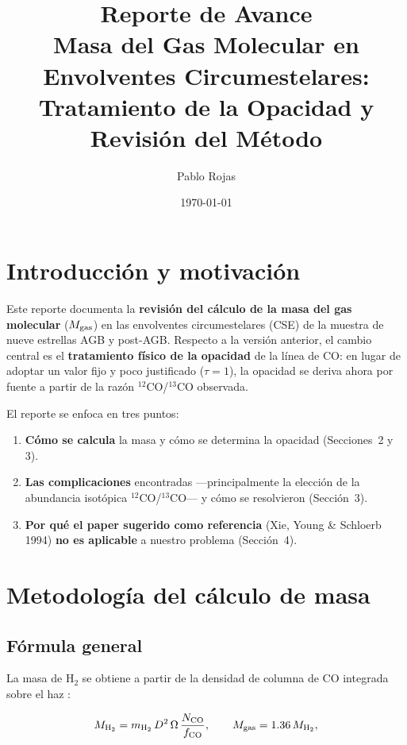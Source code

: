 \documentclass[12pt, a4paper]{article}
\title{
    \textbf{Reporte de Avance}\\[0.5em]
    \large Masa del Gas Molecular en Envolventes Circumestelares:\\
    Tratamiento de la Opacidad y Revisión del Método
}
\author{Pablo Rojas}
\date{\today}
\begin{document}
\maketitle
\tableofcontents
\newpage

\section{Introducción y motivación}

Este reporte documenta la \textbf{revisión del cálculo de la masa del gas molecular}
($M_{\rm gas}$) en las envolventes circumestelares (CSE) de la muestra de nueve estrellas
AGB y post-AGB. Respecto a la versión anterior, el cambio central es el \textbf{tratamiento
físico de la opacidad} de la línea de CO: en lugar de adoptar un valor fijo y poco
justificado ($\tau = 1$), la opacidad se deriva ahora por fuente a partir de la razón
$^{12}$CO/$^{13}$CO observada.

El reporte se enfoca en tres puntos:
\begin{enumerate}
    \item \textbf{Cómo se calcula} la masa y cómo se determina la opacidad (Secciones~2 y 3).
    \item \textbf{Las complicaciones} encontradas —principalmente la elección de la abundancia
    isotópica $^{12}$CO/$^{13}$CO— y cómo se resolvieron (Sección~3).
    \item \textbf{Por qué el paper sugerido como referencia} (Xie, Young \& Schloerb 1994)
    \textbf{no es aplicable} a nuestro problema (Sección~4).
\end{enumerate}

\section{Metodología del cálculo de masa}

\subsection{Fórmula general}

La masa de H$_2$ se obtiene a partir de la densidad de columna de CO integrada sobre
el haz \citep{choi1993, mangum2015}:

\begin{equation}
    M_{{\rm H}_2} = m_{{\rm H}_2}\, D^2\, \Omega\, \frac{N_{\rm CO}}{f_{\rm CO}},
    \qquad M_{\rm gas} = 1.36\,M_{{\rm H}_2},
    \label{eq:Mmain}
\end{equation}
\end{document}
